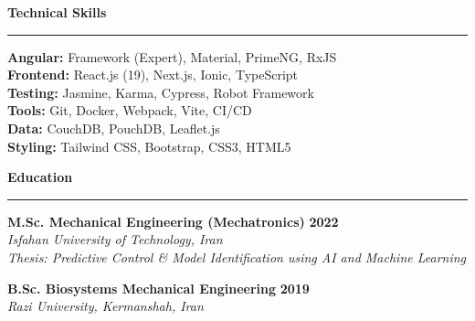 \documentclass[a4paper,10pt]{article}
\newcommand{\sectionheader}[1]{\vspace{4pt}\textbf{\large\color{headercolor}#1}\vspace{1pt}\hrule\vspace{2pt}}
\newcommand{\jobtitle}[1]{\textbf{#1}}
\newcommand{\company}[1]{\textit{\color{headercolor}#1}}
\begin{document}
\begin{multicols}{2}

\sectionheader{Technical Skills}
\textbf{Angular:} Framework (Expert), Material, PrimeNG, RxJS \\
\textbf{Frontend:} React.js (19), Next.js, Ionic, TypeScript \\
\textbf{Testing:} Jasmine, Karma, Cypress, Robot Framework \\
\textbf{Tools:} Git, Docker, Webpack, Vite, CI/CD \\
\textbf{Data:} CouchDB, PouchDB, Leaflet.js \\
\textbf{Styling:} Tailwind CSS, Bootstrap, CSS3, HTML5

\columnbreak

\sectionheader{Education}
\jobtitle{M.Sc. Mechanical Engineering (Mechatronics)} \hfill \textbf{2022} \\
\company{Isfahan University of Technology, Iran} \\
\textit{Thesis: Predictive Control \& Model Identification using AI and Machine Learning}

\vspace{1.5pt}
\jobtitle{B.Sc. Biosystems Mechanical Engineering} \hfill \textbf{2019} \\
\company{Razi University, Kermanshah, Iran}

\end{multicols}
\end{document}

